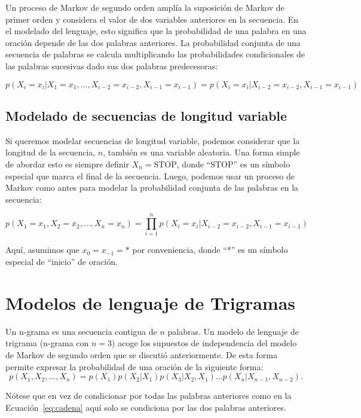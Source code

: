 Un proceso de Markov de segundo orden amplía la suposición de Markov de primer orden y considera el valor de dos variables anteriores en la secuencia. En el modelado del lenguaje, esto significa que la probabilidad de una palabra en una oración depende de las dos palabras anteriores. La probabilidad conjunta de una secuencia de palabras se calcula multiplicando las probabilidades condicionales de las palabras sucesivas dado sus dos palabras predecesoras:

\begin{equation}
p(X_i = x_i|X_1 = x_1, \ldots, X_{i-2} = x_{i-2}, X_{i-1} = x_{i-1}) = p(X_i = x_i|X_{i-2} = x_{i-2}, X_{i-1} = x_{i-1})
\end{equation}


\subsection{Modelado de secuencias de longitud variable}

Si queremos modelar secuencias de longitud variable, podemos considerar que la longitud de la secuencia, $n$, también es una variable aleatoria. Una forma simple de abordar esto es siempre definir $X_n = \text{STOP}$, donde ``STOP'' es un símbolo especial que marca el final de la secuencia. Luego, podemos usar un proceso de Markov como antes para modelar la probabilidad conjunta de las palabras en la secuencia:

\[
p(X_1 = x_1, X_2 = x_2, \ldots, X_n = x_n) = \prod_{i=1}^{n} p(X_i = x_i|X_{i-2} = x_{i-2}, X_{i-1} = x_{i-1})
\]

Aquí, asumimos que $x_0 = x_{-1} = *$ por conveniencia, donde ``*'' es un símbolo especial de ``inicio'' de oración.

\section{Modelos de lenguaje de Trigramas}

Un n-grama es una secuencia contigua de $n$ palabras. Un modelo de lenguaje de trigrama (n-grama con $n=3$) acoge los supuestos de independencia del modelo de Markov de segundo orden que se discutió anteriormente. De esta forma permite expresar la probabilidad de una oración de la siguiente forma:
\begin{equation}
p(X_1,X_2,\ldots,X_n)=p(X_1)p(X_2|X_1)p(X_3|X_2,X_1)\ldots p(X_n|X_{n-1},X_{n-2}).
\end{equation}

Nótese que en vez de condicionar por todas las palabras anteriores como en la Ecuación~\ref{eq:cadena} aquí solo se condiciona por las dos palabras anteriores.


